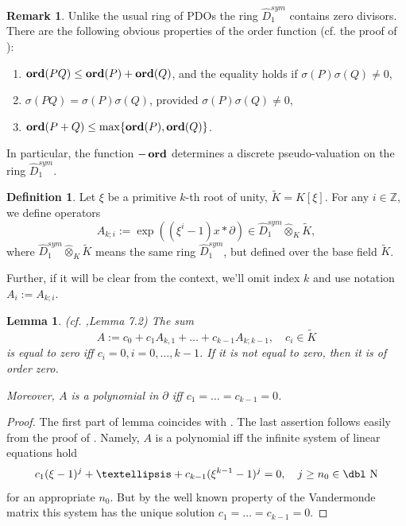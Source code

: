 \documentclass[11pt]{article}
\theoremstyle{definition}
\newcommand{\dn}{{\mbox{\dbl N}}}
\newcommand{\Ord}{\mathop {\rm \bf ord}}
\newtheorem{Def}{Definition}[section]
\newtheorem{rem}{Remark}[section]
\theoremstyle{plain}
\newtheorem{lemma}{Lemma}[section]
\numberwithin{equation}{section}
\begin{document}
\begin{rem}
\label{R:ord_properties}
Unlike the usual ring of PDOs the ring $\hat{D}_1^{sym}$ contains zero divisors. There are the following obvious properties of the order function (cf. the proof of \cite[Th. 5.3]{BurbanZheglov2017}):
\begin{enumerate}
\item
$\Ord (P Q)\le \Ord (P)+\Ord (Q)$, and the equality holds if $\sigma (P)\sigma (Q)\neq 0$,
\item
$\sigma (P Q)=\sigma (P) \sigma (Q)$, provided $\sigma (P) \sigma (Q)\neq 0$,
\item
$\Ord (P+Q)\le \max\{\Ord (P),\Ord (Q)\}$.
\end{enumerate}
In particular, the function $-\Ord$ determines  a discrete pseudo-valuation on the ring $\hat{D}_1^{sym}$. 
\end{rem}


\begin{Def}
\label{D:Aki}
	Let $\xi$ be a primitive $k$-th root of unity, $\tilde{K}=K[\xi]$. For any $i\in \mathbb{Z}$, we define operators 
	$$
	A_{k;i}:=\exp((\xi^{i}-1)x\ast \partial)\in \hat{D}^{sym}_{1}\hat{\otimes}_{K}\tilde{K},
	$$
	where $\hat{D}^{sym}_{1}\hat{\otimes}_{K}\tilde{K}$ means the same ring $\hat{D}^{sym}_{1}$, but defined over the base field $\tilde{K}$. 
	
	Further, if it will be clear from the context, we'll omit index $k$ and use notation $A_i:=A_{k;i}$.
\end{Def}

\begin{lemma}{(cf. \cite{A.Z},Lemma 7.2)}
	\label{T:A.Z L 7.2}
	The sum $$
	A:=c_0+c_1 A_{k,1}+\dots+c_{k-1}A_{k;k-1},\quad c_{i}\in \tilde{K}
	$$
	is equal to zero iff $c_{i}=0, i=0,\dots,k-1$. If it is not equal to zero, then it is of order zero. 
	
	Moreover, $A$ is a polynomial in $\partial$ iff $c_1=\ldots = c_{k-1}=0$.
\end{lemma}

\begin{proof}
The first part of lemma coincides with \cite[Lem. 7.2]{A.Z}. The last assertion follows easily from the proof of \cite[Lem. 7.2]{A.Z}. Namely, $A$ is a polynomial iff the infinite system of linear equations hold 
$$
c_1(\xi-1)^j+\ldots +c_{k-1}(\xi^{k-1}-1)^j=0, \quad j\ge n_0\in \dn
$$
for an appropriate $n_0$. But by the well known property of the Vandermonde matrix this system has the unique solution $c_1=\ldots =c_{k-1}=0$. 

\end{proof}
\end{document}
